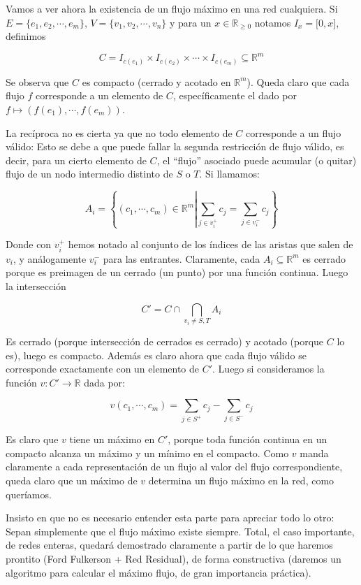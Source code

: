 \documentclass{article}
\begin{document}
Vamos a ver ahora la existencia de un flujo máximo en una red cualquiera. Si $E = \{e_1, e_2, \cdots, e_m\}$, $V = \{v_1, v_2, \cdots, v_n\}$ y para un $x \in \mathbb{R}_{\geq 0}$ notamos $I_x = \lbrack 0, x \rbrack$, definimos

$$C = I_{c(e_1)} \times I_{c(e_2)} \times \cdots \times I_{c(e_m)} \subseteq \mathbb{R}^m$$

Se observa que $C$ es compacto (cerrado y acotado en $\mathbb{R}^m$). Queda claro que cada flujo $f$ corresponde a un elemento de $C$,
específicamente el dado por $f \mapsto (f(e_1), \cdots, f(e_m))$.

La recíproca no es cierta ya que no todo elemento de $C$ corresponde a un flujo válido: Esto se debe a que puede fallar la segunda restricción
de flujo válido, es decir, para un cierto elemento de $C$, el ``flujo'' asociado puede acumular (o quitar) flujo de un nodo intermedio distinto
de $S$ o $T$. Si llamamos:

$$A_i = \left \{(c_1, \cdots, c_m) \in \mathbb{R}^m   \left | \sum_{j \in v_i^+}{c_j} = \sum_{j \in v_i^-}{c_j} \right .  \right  \}$$

Donde con $v_i^+$ hemos notado al conjunto de los índices de las aristas que salen de $v_i$, y análogamente $v_i^-$ para las entrantes.
Claramente, cada $A_i \subseteq \mathbb{R}^m$ es cerrado porque es preimagen de un cerrado (un punto) por una función continua. Luego la intersección

$$C' = C \cap \bigcap_{v_i \neq S,T}{A_i}$$

Es cerrado (porque intersección de cerrados es cerrado) y acotado (porque $C$ lo es), luego es compacto. Además es claro ahora que cada flujo
válido se corresponde exactamente con un elemento de $C'$. Luego si consideramos la función $v: C' \rightarrow \mathbb{R}$ dada por:

$$v(c_1, \cdots, c_m) = \sum_{j \in S^+}{c_j} - \sum_{j \in S^-}{c_j}$$

Es claro que $v$ tiene un máximo en $C'$, porque toda función continua en un compacto alcanza un máximo y un mínimo en el compacto. Como
$v$ manda claramente a cada representación de un flujo al valor del flujo correspondiente, queda claro que un máximo de $v$ determina un
flujo máximo en la red, como queríamos.

Insisto en que no es necesario entender esta parte para apreciar todo lo otro: Sepan simplemente que el flujo máximo existe siempre. Total,
el caso importante, de redes enteras, quedará demostrado claramente a partir de lo que haremos prontito (Ford Fulkerson + Red Residual), de
forma constructiva (daremos un algoritmo para calcular el máximo flujo, de gran importancia práctica).
\end{document}

